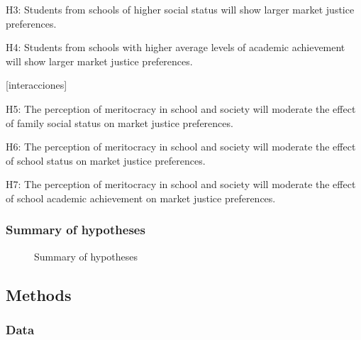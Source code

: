 \documentclass[
  letterpaper,
  DIV=11,
  numbers=noendperiod]{scrartcl}
\begin{document}
H3: Students from schools of higher social status will show larger
market justice preferences.

H4: Students from schools with higher average levels of academic
achievement will show larger market justice preferences.

{[}interacciones{]}

H5: The perception of meritocracy in school and society will moderate
the effect of family social status on market justice preferences.

H6: The perception of meritocracy in school and society will moderate
the effect of school status on market justice preferences.

H7: The perception of meritocracy in school and society will moderate
the effect of school academic achievement on market justice preferences.

\subsubsection{Summary of hypotheses}\label{summary-of-hypotheses}

\begin{figure}


\caption{\label{fig-hypotheses}Summary of hypotheses}

\end{figure}%

\subsection{Methods}\label{methods}

\subsubsection{Data}\label{data}
\end{document}
